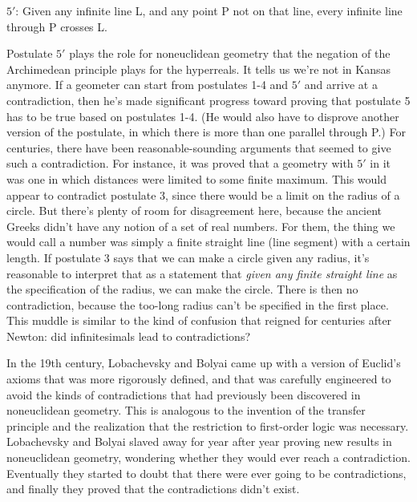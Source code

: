 \qquad $5'$: Given any infinite line L, and any point P not on that line,
every infinite line through P crosses L.

Postulate $5'$ plays the role for noneuclidean geometry that the negation of the Archimedean principle
plays for the hyperreals. It tells us we're not in Kansas anymore. If a geometer can start from
postulates 1-4 and $5'$ and arrive at a contradiction, then he's made significant progress toward
proving that postulate 5 has to be true based on postulates 1-4. (He would also have to disprove
another version of the postulate, in which there is more than one parallel through P.) For centuries,
there have been reasonable-sounding arguments that seemed to give such a contradiction. For instance,
it was proved that a geometry with $5'$ in it was one in which distances were limited to some finite
maximum. This would appear to contradict postulate 3, since there would be a limit on the radius
of a circle. But there's plenty of room for disagreement here, because the ancient Greeks didn't
have any notion of a set of real numbers. For them, the thing we would call a number was simply a
finite straight line (line segment) with a certain length. If postulate 3 says that we can make a circle given any radius,
it's reasonable to interpret that as a statement that \emph{given any finite straight line} as the
specification of the radius, we can make the circle. There is then no contradiction, because the too-long
radius can't be specified in the first place. This muddle is similar to the kind of confusion that
reigned for centuries after Newton: did infinitesimals lead to contradictions?

In the 19th century, Lobachevsky and Bolyai came up with a version of Euclid's axioms
that was more rigorously defined, and that was carefully engineered to avoid the kinds of
contradictions that had previously been discovered in noneuclidean geometry. This is analogous
to the invention of the transfer principle and the realization that the restriction to first-order
logic was necessary. Lobachevsky and Bolyai slaved away for year after year proving new results
in noneuclidean geometry, wondering whether they would ever reach a contradiction. Eventually they
started to doubt that there were ever going to be contradictions, and finally they proved that
the contradictions didn't exist.

